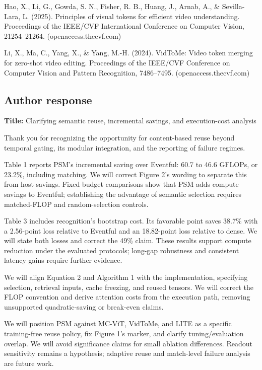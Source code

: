 \documentclass[11pt]{article}
\begin{document}
Hao, X., Li, G., Gowda, S. N., Fisher, R. B., Huang, J., Arnab, A., \& Sevilla-Lara, L. (2025). Principles of visual tokens for efficient video understanding. Proceedings of the IEEE/CVF International Conference on Computer Vision, 21254--21264. (openaccess.thecvf.com)

Li, X., Ma, C., Yang, X., \& Yang, M.-H. (2024). VidToMe: Video token merging for zero-shot video editing. Proceedings of the IEEE/CVF Conference on Computer Vision and Pattern Recognition, 7486--7495. (openaccess.thecvf.com)

\subsection{Author response}

\textbf{Title:} Clarifying semantic reuse, incremental savings, and execution-cost analysis

Thank you for recognizing the opportunity for content-based reuse beyond temporal gating, its modular integration, and the reporting of failure regimes.

Table 1 reports PSM's incremental saving over Eventful: 60.7 to 46.6 GFLOPs, or 23.2\%, including matching. We will correct Figure 2's wording to separate this from host savings. Fixed-budget comparisons show that PSM adds compute savings to Eventful; establishing the advantage of semantic selection requires matched-FLOP and random-selection controls.

Table 3 includes recognition's bootstrap cost. Its favorable point saves 38.7\% with a 2.56-point loss relative to Eventful and an 18.82-point loss relative to dense. We will state both losses and correct the 49\% claim. These results support compute reduction under the evaluated protocols; long-gap robustness and consistent latency gains require further evidence.

We will align Equation 2 and Algorithm 1 with the implementation, specifying selection, retrieval inputs, cache freezing, and reused tensors. We will correct the FLOP convention and derive attention costs from the execution path, removing unsupported quadratic-saving or break-even claims.

We will position PSM against MC-ViT, VidToMe, and LITE as a specific training-free reuse policy, fix Figure 1's marker, and clarify tuning/evaluation overlap. We will avoid significance claims for small ablation differences. Readout sensitivity remains a hypothesis; adaptive reuse and match-level failure analysis are future work.
\end{document}
